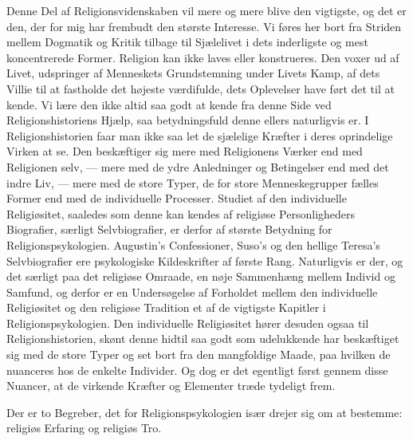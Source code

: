 \documentclass[12pt,a4paper]{article}
\newcommand{\opage}[1]{\marginnote{\footnotesize\textit{[#1]}}}
\begin{document}
Denne Del af Religionsvidenskaben vil mere og mere blive den vigtigste, og det
er den, der for mig har frembudt den største Interesse. Vi føres her bort fra
Striden mellem Dogmatik og Kritik tilbage til Sjælelivet i dets inderligste og
mest
\opage{416} %
koncentrerede Former. Religion kan ikke laves eller konstrueres. Den voxer ud
af Livet, udspringer af Menneskets Grundstemning under Livets Kamp, af dets
Villie til at fastholde det højeste værdifulde, dets Oplevelser have ført det
til at kende. Vi lære den ikke altid saa godt at kende fra denne Side ved
Religionshistoriens Hjælp, saa betydningsfuld denne ellers naturligvis er. I
Religionshistorien faar man ikke saa let de sjælelige Kræfter i deres
oprindelige Virken at se. Den beskæftiger sig mere med Religionens Værker end
med Religionen selv, --- mere med de ydre Anledninger og Betingelser end med
det indre Liv, --- mere med de store Typer, de for store Menneskegrupper
fælles Former end med de individuelle Processer. Studiet af den individuelle
Religiøsitet, saaledes som denne kan kendes af religiøse Personligheders
Biografier, særligt Selvbiografier, er derfor af største Betydning for
Religionspsykologien. Augustin's Confessioner, Suso's og den hellige Teresa's
Selvbiografier ere psykologiske Kildeskrifter af første Rang. Naturligvis er
der, og det særligt paa det religiøse Omraade, en nøje Sammenhæng mellem
Individ og Samfund, og derfor er en Undersøgelse af Forholdet mellem den
individuelle Religiøsitet og den religiøse Tradition et af de vigtigste
Kapitler i Religionspsykologien. Den individuelle Religiøsitet hører desuden
ogsaa til Religionshistorien, skønt denne hidtil saa godt som udelukkende har
beskæftiget sig med de store Typer og set bort fra den mangfoldige Maade, paa
hvilken de nuanceres hos de enkelte Individer. Og dog er det egentligt først
gennem disse Nuancer, at de virkende Kræfter og Elementer træde tydeligt frem.

Der er to Begreber, det for Religionspsykologien især drejer sig om at
bestemme: religiøs Erfaring og religiøs Tro.
\end{document}
